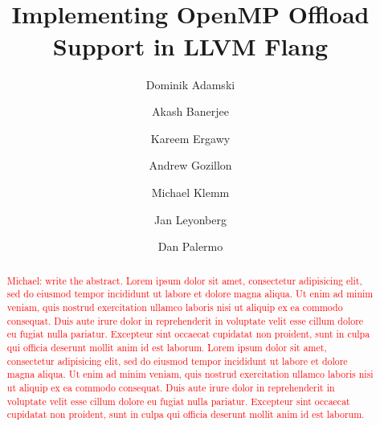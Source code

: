 \documentclass[acmtog,natbib=false]{acmart}
\newcommand{\todo}[1]{\textcolor{red}{#1}}
\newcommand{\registered}[0]{\textsuperscript{\textregistered}\xspace}
\begin{document}
\title{Implementing OpenMP\registered Offload Support in LLVM Flang}

\author{Dominik Adamski}
\orcid{}

\author{Akash Banerjee}
\orcid{}

\author{Kareem Ergawy}

\author{Andrew Gozillon}

\author{Michael Klemm}

\author{Jan Leyonberg}
\orcid{}

\author{Dan Palermo}

\renewcommand{\shortauthors}{Adamski et al.}

\begin{abstract}
\todo{Michael: write the abstract.}
\todo{Lorem ipsum dolor sit amet, consectetur adipisicing elit, sed do eiusmod
tempor incididunt ut labore et dolore magna aliqua. Ut enim ad minim veniam,
quis nostrud exercitation ullamco laboris nisi ut aliquip ex ea commodo
consequat. Duis aute irure dolor in reprehenderit in voluptate velit esse
cillum dolore eu fugiat nulla pariatur. Excepteur sint occaecat cupidatat non
proident, sunt in culpa qui officia deserunt mollit anim id est laborum.
Lorem ipsum dolor sit amet, consectetur adipisicing elit, sed do eiusmod
tempor incididunt ut labore et dolore magna aliqua. Ut enim ad minim veniam,
quis nostrud exercitation ullamco laboris nisi ut aliquip ex ea commodo
consequat. Duis aute irure dolor in reprehenderit in voluptate velit esse
cillum dolore eu fugiat nulla pariatur. Excepteur sint occaecat cupidatat non
proident, sunt in culpa qui officia deserunt mollit anim id est laborum.}
\end{abstract}
\end{document}
